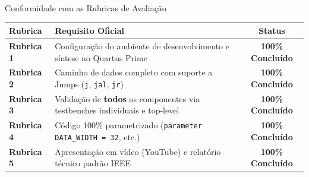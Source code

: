 \documentclass[aspectratio=169, 11pt]{beamer}
\begin{document}
\begin{frame}{Conformidade com as Rubricas de Avaliação}
  \centering
  \small
  \begin{tabular}{lp{8.2cm}c}
    \toprule
    \textbf{Rubrica} & \textbf{Requisito Oficial} & \textbf{Status} \\
    \midrule
    \textbf{Rubrica 1} & Configuração do ambiente de desenvolvimento e síntese no Quartus Prime & \textcolor{passgreen}{\textbf{100\% Concluído}} \\
    \addlinespace[3pt]
    \textbf{Rubrica 2} & Caminho de dados completo com suporte a Jumps (\texttt{j}, \texttt{jal}, \texttt{jr}) & \textcolor{passgreen}{\textbf{100\% Concluído}} \\
    \addlinespace[3pt]
    \textbf{Rubrica 3} & Validação de \textbf{todos} os componentes via testbenches individuais e top-level & \textcolor{passgreen}{\textbf{100\% Concluído}} \\
    \addlinespace[3pt]
    \textbf{Rubrica 4} & Código 100\% parametrizado (\texttt{parameter DATA\_WIDTH = 32}, etc.) & \textcolor{passgreen}{\textbf{100\% Concluído}} \\
    \addlinespace[3pt]
    \textbf{Rubrica 5} & Apresentação em vídeo (YouTube) e relatório técnico padrão IEEE & \textcolor{passgreen}{\textbf{100\% Concluído}} \\
    \bottomrule
  \end{tabular}
\end{frame}
\end{document}
